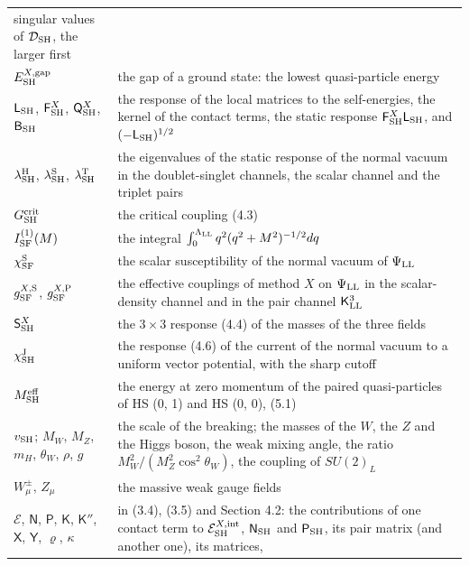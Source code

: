 \documentclass[
  10pt,
]{article}
\begin{document}
\begin{longtable}[]{@{}
  >{\raggedright\arraybackslash}p{}
  >{\raggedright\arraybackslash}p{}@{}}
singular values of \(\mathcal D_{\rm SH}\), the larger first \\
\(E^{X,{\rm gap}}_{\rm SH}\) & the gap of a ground state: the lowest
quasi-particle energy \\
\(\mathsf L_{\rm SH}\), \(\mathsf F^X_{\rm SH}\),
\(\mathsf Q^X_{\rm SH}\), \(\mathsf B_{\rm SH}\) & the response of the
local matrices to the self-energies, the kernel of the contact terms,
the static response \(\mathsf F^X_{\rm SH}\mathsf L_{\rm SH}\), and
\((-\mathsf L_{\rm SH})^{1/2}\) \\
\(\lambda^{\rm H}_{\rm SH}\), \(\lambda^{\rm S}_{\rm SH}\),
\(\lambda^{\rm T}_{\rm SH}\) & the eigenvalues of the static response of
the normal vacuum in the doublet-singlet channels, the scalar channel
and the triplet pairs \\
\(G^{\rm crit}_{\rm SH}\) & the critical coupling (4.3) \\
\(I^{(1)}_{\rm SF}(M)\) & the integral
\(\int_0^{\Lambda_{\rm LL}}q^2(q^2+M^2)^{-1/2}dq\) \\
\(\chi^{\rm S}_{\rm SF}\) & the scalar susceptibility of the normal
vacuum of \(\Psi_{\rm LL}\) \\
\(g^{X,{\rm S}}_{\rm SF}\), \(g^{X,{\rm P}}_{\rm SF}\) & the effective
couplings of method \(X\) on \(\Psi_{\rm LL}\) in the scalar-density
channel and in the pair channel \(\mathsf K^3_{\rm LL}\) \\
\(\mathsf S^X_{\rm SH}\) & the \(3\times3\) response (4.4) of the masses
of the three fields \\
\(\chi^{\rm J}_{\rm SH}\) & the response (4.6) of the current of the
normal vacuum to a uniform vector potential, with the sharp cutoff \\
\(M^{\rm eff}_{\rm SH}\) & the energy at zero momentum of the paired
quasi-particles of HS (0, 1) and HS (0, 0), (5.1) \\
\(v_{\rm SH}\); \(M_W\), \(M_Z\), \(m_H\), \(\theta_W\), \(\rho\), \(g\)
& the scale of the breaking; the masses of the \(W\), the \(Z\) and the
Higgs boson, the weak mixing angle, the ratio
\(M_W^2/(M_Z^2\cos^2\theta_W)\), the coupling of \(SU(2)_L\) \\
\(W^\pm_\mu\), \(Z_\mu\) & the massive weak gauge fields \\
\(\mathcal E\), \(\mathsf N\), \(\mathsf P\), \(\mathsf K\),
\(\mathsf K''\), \(\mathsf X\), \(\mathsf Y\), \(\varrho\), \(\kappa\) &
in (3.4), (3.5) and Section 4.2: the contributions of one contact term
to \(\mathcal E^{X,{\rm int}}_{\rm SH}\), \(\mathsf N_{\rm SH}\) and
\(\mathsf P_{\rm SH}\), its pair matrix (and another one), its matrices,

\end{longtable}
\end{document}
